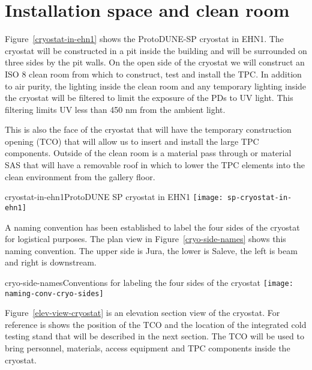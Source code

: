 
\section{Installation space and clean room}

Figure~\ref{cryostat-in-ehn1} shows the ProtoDUNE-SP cryostat in EHN1.  The cryostat will be constructed in a pit inside the building and will be surrounded on three sides by the pit walls.  On the open side of the cryostat we will construct an ISO 8 clean room from which to construct, test and install the TPC.  In addition to air purity, the lighting inside the clean room and any temporary lighting inside the cryostat will be filtered to limit the exposure of the PDs to UV light.  This filtering limits UV less than 450 nm from the ambient light.  

This is also the face of the cryostat that will have the temporary construction opening (TCO) that will allow us to insert and install the large TPC components.  Outside of the clean room is a material pass through or material SAS that will have a removable roof in which to lower the TPC elements into the clean environment from the gallery floor.

\begin{cdrfigure}{cryostat-in-ehn1}{ProtoDUNE SP cryostat in EHN1}
\texttt{[image: sp-cryostat-in-ehn1]}
\end{cdrfigure}

A naming convention has been established to label the four sides of the cryostat for logistical purposes.  The plan view in Figure~\ref{cryo-side-names} shows this naming convention.  The upper side is Jura, the lower is Saleve, the left is beam and right is downstream.

\begin{cdrfigure}{cryo-side-names}{Conventions for labeling the four sides of the cryostat}
\texttt{[image: naming-conv-cryo-sides]}
\end{cdrfigure}

Figure~\ref{elev-view-cryostat} is an elevation section view of the cryostat.  For reference is shows the position of the TCO and the location of the integrated cold testing stand that will be described in the next section.  The TCO will be used to bring personnel, materials, access equipment and TPC components inside the cryostat. 


